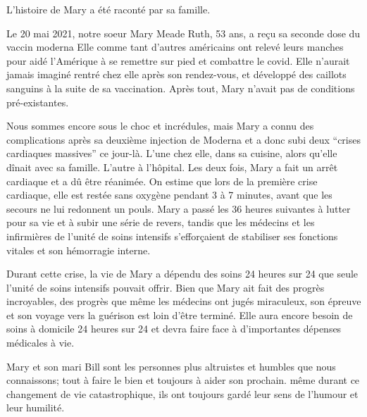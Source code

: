 L'histoire de Mary a été raconté par sa famille.

Le 20 mai 2021, notre soeur Mary Meade Ruth, 53 ans, a reçu sa seconde dose du vaccin moderna Elle comme tant d'autres américains ont relevé leurs manches pour aidé l'Amérique à se remettre sur pied et combattre le covid. Elle n'aurait jamais imaginé rentré chez elle après son rendez-vous, et développé des caillots sanguins à la suite de sa vaccination. Après tout, Mary n'avait pas de conditions pré-existantes.

Nous sommes encore sous le choc et incrédules, mais Mary a connu des complications après sa deuxième injection de Moderna et a donc subi deux “crises cardiaques massives” ce jour-là. L'une chez elle, dans sa cuisine, alors qu'elle dînait avec sa famille. L'autre à l'hôpital. Les deux fois, Mary a fait un arrêt cardiaque et a dû être réanimée. On estime que lors de la première crise cardiaque, elle est restée sans oxygène pendant 3 à 7 minutes, avant que les secours ne lui redonnent un pouls. Mary a passé les 36 heures suivantes à lutter pour sa vie et à subir une série de revers, tandis que les médecins et les infirmières de l'unité de soins intensifs s'efforçaient de stabiliser ses fonctions vitales et son hémorragie interne.

Durant cette crise, la vie de Mary a dépendu des soins 24 heures sur 24 que seule l'unité de soins intensifs pouvait offrir. Bien que Mary ait fait des progrès incroyables, des progrès que même les médecins ont jugés miraculeux, son épreuve et son voyage vers la guérison est loin d'être terminé. Elle aura encore besoin de soins à domicile 24 heures sur 24 et devra faire face à d'importantes dépenses médicales à vie.

Mary et son mari Bill sont les personnes plus altruistes et humbles que nous connaissons; tout à faire le bien et toujours à aider son prochain. même durant ce changement de vie catastrophique, ils ont toujours gardé leur sens de l'humour et leur humilité.

